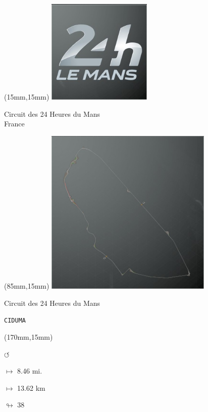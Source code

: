 \begin{textblock*}{60mm}(15mm,15mm)%
\includegraphics[width=50mm]{LG/2015-05-20_00084.png}
\par Circuit des 24 Heures du Mans\\ France
\end{textblock*}
\begin{textblock*}{80mm}(85mm,15mm)%
\includegraphics[width=80mm]{TR/2015-05-20_00031.png}
\centerline{Circuit des 24 Heures du Mans}
\par\hfill\tiny\tt CIDUMA\\
\end{textblock*}
\begin{textblock*}{30mm}(170mm,15mm)%
\par \Huge$\circlearrowleft$
\Large
\par$\mapsto$ 8.46 mi.
\par$\mapsto$ 13.62 km
\par$\looparrowright$ 38
\end{textblock*}
